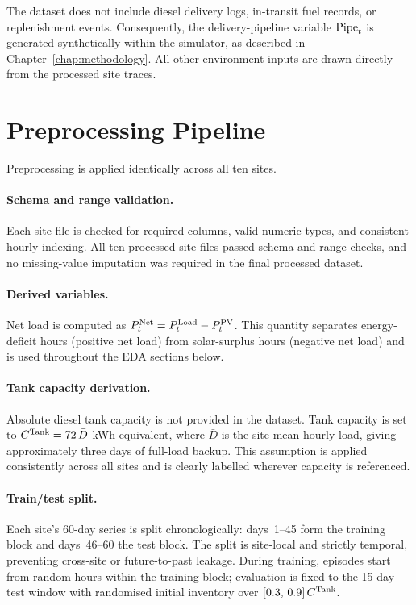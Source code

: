 The dataset does not include diesel delivery logs, in-transit fuel records, or
replenishment events.  Consequently, the delivery-pipeline variable $\mathrm{Pipe}_t$
is generated synthetically within the simulator, as described in
Chapter~\ref{chap:methodology}.  All other environment inputs are drawn
directly from the processed site traces.


\section{Preprocessing Pipeline}
\label{sec:preprocessing}

Preprocessing is applied identically across all ten sites.

\paragraph{Schema and range validation.}
Each site file is checked for required columns, valid numeric types, and
consistent hourly indexing.  All ten processed site files passed schema and
range checks, and no missing-value imputation was required in the final
processed dataset.

\paragraph{Derived variables.}
Net load is computed as $P_t^{\mathrm{Net}} = P_t^{\mathrm{Load}} - P_t^{\mathrm{PV}}$.  This
quantity separates energy-deficit hours (positive net load) from
solar-surplus hours (negative net load) and is used throughout the EDA
sections below.

\paragraph{Tank capacity derivation.}
Absolute diesel tank capacity is not provided in the dataset.  Tank capacity
is set to $C^{\mathrm{Tank}} = 72\,\bar{D}$ kWh-equivalent, where $\bar{D}$ is the
site mean hourly load, giving approximately three days of full-load backup.
This assumption is applied consistently across all sites and is clearly
labelled wherever capacity is referenced.

\paragraph{Train/test split.}
Each site's 60-day series is split chronologically: days~1--45 form the
training block and days~46--60 the test block.  The split is site-local and
strictly temporal, preventing cross-site or future-to-past leakage.  During
training, episodes start from random hours within the training block;
evaluation is fixed to the 15-day test window with randomised initial
inventory over $[0.3,\,0.9]\,C^{\mathrm{Tank}}$.

